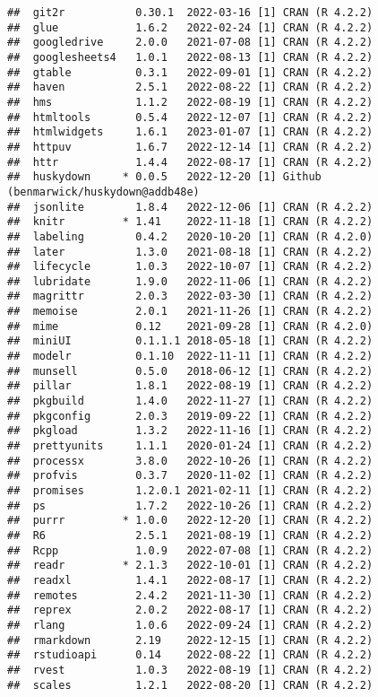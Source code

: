 \documentclass[print]{nuthesis}
\begin{document}
\begin{verbatim}
##  git2r           0.30.1  2022-03-16 [1] CRAN (R 4.2.2)
##  glue            1.6.2   2022-02-24 [1] CRAN (R 4.2.2)
##  googledrive     2.0.0   2021-07-08 [1] CRAN (R 4.2.2)
##  googlesheets4   1.0.1   2022-08-13 [1] CRAN (R 4.2.2)
##  gtable          0.3.1   2022-09-01 [1] CRAN (R 4.2.2)
##  haven           2.5.1   2022-08-22 [1] CRAN (R 4.2.2)
##  hms             1.1.2   2022-08-19 [1] CRAN (R 4.2.2)
##  htmltools       0.5.4   2022-12-07 [1] CRAN (R 4.2.2)
##  htmlwidgets     1.6.1   2023-01-07 [1] CRAN (R 4.2.2)
##  httpuv          1.6.7   2022-12-14 [1] CRAN (R 4.2.2)
##  httr            1.4.4   2022-08-17 [1] CRAN (R 4.2.2)
##  huskydown     * 0.0.5   2022-12-20 [1] Github (benmarwick/huskydown@addb48e)
##  jsonlite        1.8.4   2022-12-06 [1] CRAN (R 4.2.2)
##  knitr         * 1.41    2022-11-18 [1] CRAN (R 4.2.2)
##  labeling        0.4.2   2020-10-20 [1] CRAN (R 4.2.0)
##  later           1.3.0   2021-08-18 [1] CRAN (R 4.2.2)
##  lifecycle       1.0.3   2022-10-07 [1] CRAN (R 4.2.2)
##  lubridate       1.9.0   2022-11-06 [1] CRAN (R 4.2.2)
##  magrittr        2.0.3   2022-03-30 [1] CRAN (R 4.2.2)
##  memoise         2.0.1   2021-11-26 [1] CRAN (R 4.2.2)
##  mime            0.12    2021-09-28 [1] CRAN (R 4.2.0)
##  miniUI          0.1.1.1 2018-05-18 [1] CRAN (R 4.2.2)
##  modelr          0.1.10  2022-11-11 [1] CRAN (R 4.2.2)
##  munsell         0.5.0   2018-06-12 [1] CRAN (R 4.2.2)
##  pillar          1.8.1   2022-08-19 [1] CRAN (R 4.2.2)
##  pkgbuild        1.4.0   2022-11-27 [1] CRAN (R 4.2.2)
##  pkgconfig       2.0.3   2019-09-22 [1] CRAN (R 4.2.2)
##  pkgload         1.3.2   2022-11-16 [1] CRAN (R 4.2.2)
##  prettyunits     1.1.1   2020-01-24 [1] CRAN (R 4.2.2)
##  processx        3.8.0   2022-10-26 [1] CRAN (R 4.2.2)
##  profvis         0.3.7   2020-11-02 [1] CRAN (R 4.2.2)
##  promises        1.2.0.1 2021-02-11 [1] CRAN (R 4.2.2)
##  ps              1.7.2   2022-10-26 [1] CRAN (R 4.2.2)
##  purrr         * 1.0.0   2022-12-20 [1] CRAN (R 4.2.2)
##  R6              2.5.1   2021-08-19 [1] CRAN (R 4.2.2)
##  Rcpp            1.0.9   2022-07-08 [1] CRAN (R 4.2.2)
##  readr         * 2.1.3   2022-10-01 [1] CRAN (R 4.2.2)
##  readxl          1.4.1   2022-08-17 [1] CRAN (R 4.2.2)
##  remotes         2.4.2   2021-11-30 [1] CRAN (R 4.2.2)
##  reprex          2.0.2   2022-08-17 [1] CRAN (R 4.2.2)
##  rlang           1.0.6   2022-09-24 [1] CRAN (R 4.2.2)
##  rmarkdown       2.19    2022-12-15 [1] CRAN (R 4.2.2)
##  rstudioapi      0.14    2022-08-22 [1] CRAN (R 4.2.2)
##  rvest           1.0.3   2022-08-19 [1] CRAN (R 4.2.2)
##  scales          1.2.1   2022-08-20 [1] CRAN (R 4.2.2)

\end{verbatim}
\end{document}
